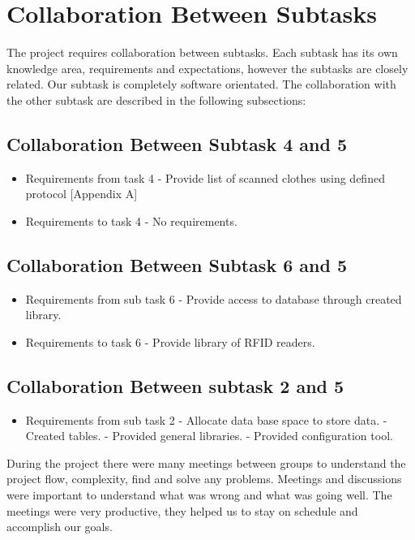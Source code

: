 %
\section{Collaboration Between Subtasks}

The project requires collaboration between subtasks. Each subtask has its own knowledge area, requirements and expectations, however the subtasks are closely related. Our subtask is completely software orientated. The collaboration with the other subtask are described in the following subsections:

\subsection{Collaboration Between Subtask 4 and 5}
\begin{itemize}
	\item Requirements from task 4
	\subitem - Provide list of scanned clothes using defined protocol [Appendix A]
	\item Requirements to task 4
	\subitem - No requirements.
\end{itemize}

\subsection{Collaboration Between Subtask 6 and 5}
\begin{itemize}
	\item Requirements from sub task 6
	\subitem - Provide access to database through created library.
	\item Requirements to task 6
	\subitem - Provide library of RFID readers.
\end{itemize}

\subsection{Collaboration Between subtask 2 and 5}
\begin{itemize}
	\item Requirements from sub task 2
	\subitem - Allocate data base space to store data.
	\subitem - Created tables.
	\subitem - Provided general libraries.
	\subitem - Provided configuration tool.
\end{itemize}

During the project there were many meetings between groups to understand the project flow, complexity, find and solve any problems. Meetings and discussions were important to understand what was wrong and what was going well. The meetings were very productive, they helped us to stay on schedule and accomplish our goals.